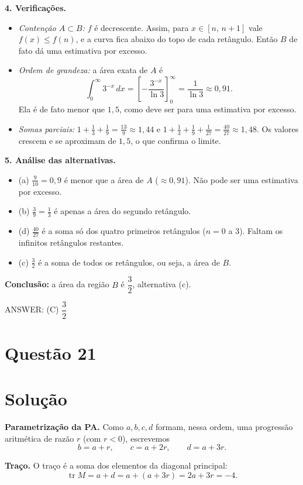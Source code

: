 \documentclass{article}%
\begin{document}
\textbf{4. Verificações.}
\begin{itemize}
\item \emph{Contenção $A\subset B$:} $f$ é decrescente. Assim, para $x\in[n,\,n+1]$ vale $f(x)\le f(n)$, e a curva fica abaixo do topo de cada retângulo. Então $B$ de fato dá uma estimativa por excesso.
\item \emph{Ordem de grandeza:} a área exata de $A$ é
\[
\int_{0}^{\infty}3^{-x}\,dx=\left[-\frac{3^{-x}}{\ln 3}\right]_{0}^{\infty}=\frac{1}{\ln 3}\approx 0{,}91 .
\]
Ela é de fato menor que $1{,}5$, como deve ser para uma estimativa por excesso.
\item \emph{Somas parciais:} $1+\frac{1}{3}+\frac{1}{9}=\frac{13}{9}\approx 1{,}44$ e $1+\frac{1}{3}+\frac{1}{9}+\frac{1}{27}=\frac{40}{27}\approx 1{,}48$. Os valores crescem e se aproximam de $1{,}5$, o que confirma o limite.
\end{itemize}

\textbf{5. Análise das alternativas.}
\begin{itemize}
\item (a) $\frac{9}{10}=0{,}9$ é menor que a área de $A$ ($\approx 0{,}91$). Não pode ser uma estimativa por excesso.
\item (b) $\frac{3}{9}=\frac{1}{3}$ é apenas a área do segundo retângulo.
\item (d) $\frac{40}{27}$ é a soma só dos quatro primeiros retângulos ($n=0$ a $3$). Faltam os infinitos retângulos restantes.
\item (c) $\frac{3}{2}$ é a soma de todos os retângulos, ou seja, a área de $B$.
\end{itemize}

\textbf{Conclusão:} a área da região $B$ é $\dfrac{3}{2}$, alternativa (c).

ANSWER: (C) $\dfrac{3}{2}$%
\newpage%
\section*{Questão 21}

\section*{Solução}

\textbf{Parametrização da PA.} Como $a,b,c,d$ formam, nessa ordem, uma progressão aritmética de razão $r$ (com $r<0$), escrevemos
\[
b=a+r,\qquad c=a+2r,\qquad d=a+3r .
\]

\textbf{Traço.} O traço é a soma dos elementos da diagonal principal:
\[
\operatorname{tr}M=a+d=a+(a+3r)=2a+3r=-4. \tag{1}
\]
\end{document}
